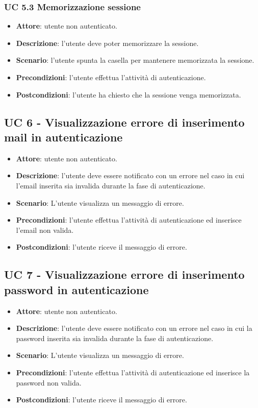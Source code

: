 \subsubsection{UC 5.3 Memorizzazione sessione}
\begin{itemize}
    \item \textbf{Attore}: utente non autenticato.
    \item \textbf{Descrizione}: l'utente deve poter memorizzare la sessione.
    \item \textbf{Scenario}: l'utente spunta la casella per mantenere memorizzata la sessione.
    \item \textbf{Precondizioni}: l'utente effettua l'attività di autenticazione.
    \item \textbf{Postcondizioni}: l'utente ha chiesto che la sessione venga memorizzata.
\end{itemize}

\subsection{UC 6 - Visualizzazione errore di inserimento mail in autenticazione}
\begin{itemize}
    \item \textbf{Attore}: utente non autenticato.
    \item \textbf{Descrizione}: l'utente deve essere notificato con un errore nel caso in cui l'email inserita sia invalida durante la fase di autenticazione.
    \item \textbf{Scenario}: L'utente visualizza un messaggio di errore. 
    \item \textbf{Precondizioni}: l'utente effettua l'attività di autenticazione ed inserisce l'email non valida.
    \item \textbf{Postcondizioni}: l'utente riceve il messaggio di errore.
\end{itemize}

\subsection{UC 7 - Visualizzazione errore di inserimento password in autenticazione} 
\begin{itemize}
    \item \textbf{Attore}: utente non autenticato.
    \item \textbf{Descrizione}: l'utente deve essere notificato con un errore nel caso in cui la password inserita sia invalida durante la fase di autenticazione.
    \item \textbf{Scenario}: L'utente visualizza un messaggio di errore. 
    \item \textbf{Precondizioni}: l'utente effettua l'attività di autenticazione ed inserisce la password non valida.
    \item \textbf{Postcondizioni}: l'utente riceve il messaggio di errore.
\end{itemize}

